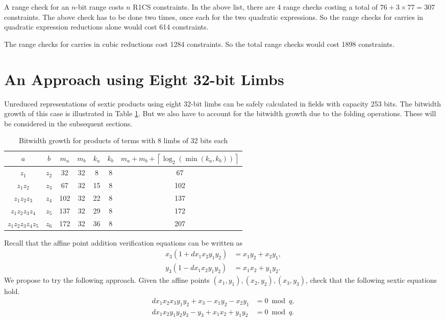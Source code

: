 \documentclass[a4paper, 12pt]{article}
\begin{document}
A range check for an $n$-bit range costs $n$ R1CS constraints. In the above list, there are 4 range checks costing a total of $76 + 3 \times 77 = 307$ constraints. The above check has to be done two times, once each for the two quadratic expressions. So the range checks for carries in quadratic expression reductions alone would cost 614 constraints.

The range checks for carries in cubic reductions cost 1284 constraints. So the total range checks would cost 1898 constraints.
\section{An Approach using Eight 32-bit Limbs}%
\label{sec:an_approach_using_eight_32_bit_limbs}
Unreduced representations of sextic products using eight 32-bit limbs can be safely calculated in fields with capacity 253 bits. The bitwidth growth of this case is illustrated in Table \ref{tab:limb32}. But we also have to account for the bitwidth growth due to the folding operations. These will be considered in the subsequent sections.
\begin{table}[h]
  \centering
  \begin{tabular}{c|c|c|c|c|c|c}
    $a$ & $b$ & $m_a$ & $m_b$ & $k_a$ & $k_b$ & $m_a+m_b+\left\lceil \log_2 \left( \min\left( k_a, k_b \right) \right) \right\rceil$ \\ \hline
    $z_1$ & $z_2$ & 32 & 32 & 8 & 8 & 67 \\ \hline
    $z_1z_2$ & $z_3$ & 67 & 32 & 15 & 8 & 102 \\ \hline
    $z_1z_2z_3$ & $z_4$ & 102 & 32 & 22 & 8 & 137 \\ \hline
    $z_1z_2z_3z_4$ & $z_5$ & 137 & 32 & 29 & 8 & 172 \\ \hline
    $z_1z_2z_3z_4z_5$ & $z_6$ & 172 & 32 & 36 & 8 & 207 \\ \hline
  \end{tabular}
  \caption{Bitwidth growth for products of terms with 8 limbs of 32 bits each}
  \label{tab:limb32}
\end{table}

Recall that the affine point addition verification equations can be written as
\begin{align}
  x_3(1+dx_1x_2y_1y_2) &= x_1y_2 + x_2y_1,\\
  y_3(1-dx_1x_2y_1y_2) &= x_1x_2 + y_1y_2.
  \label{eqn:additionAffineVerificationLimbs8}
\end{align}
We propose to try the following approach. Given the affine points $(x_1, y_1), (x_2, y_2), (x_3, y_3)$, check that the following sextic equations hold.
\begin{align}
  dx_1x_2x_3y_1y_2 + x_3 - x_1y_2 - x_2y_1 &= 0 \bmod q,\label{eqn1}\\
  dx_1x_2y_1y_2y_3 - y_3 + x_1x_2 + y_1y_2 &= 0 \bmod q.\label{eqn2}
\end{align}
\end{document}
